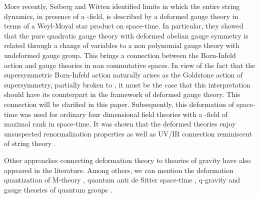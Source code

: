 \documentclass[a4paper,12pt]{article}
\begin{document}
 More recently, Seiberg and Witten \cite{sw}
identified limits in which the entire string dynamics, in
presence of a \coordHE{}-field, is described by a 
 deformed  gauge theory in terms of a Weyl-Moyal star product on
space-time.
In particular, they showed  that the pure quadratic gauge theory with
deformed abelian 
gauge symmetry is related through a change of variables to a non
polynomial gauge theory 
with undeformed gauge group. This brings a connection between the
Born-Infeld action and
gauge theories in non commutative spaces. In view of the fact that the
supersymmetric 
Born-Infeld \cite{cf} action naturally arises as the Goldstone action of
\coordHE{} supersymmetry,
partially broken to \coordHE{} \cite{bg}, it must be the case that this
interpretation should have its 
counterpart in the framework of deformed gauge theory. This connection
will be clarified in this paper. 
 Subsequently,
this  deformation of space-time was used  for  ordinary four dimensional
field theories with a 
\coordHE{}-field of maximal rank in \coordHE{} space-time.
It was shown that the deformed theories enjoy unsuspected renormalization
properties as well
as UV/IR connection reminiscent of string theory \cite{mrs}. 

Other approaches connecting deformation theory to theories of gravity have
also  
appeared in the literature.  Among others, we can mention the deformation quantization
of M-theory
\cite{mn}, quantum anti de Sitter space-time \cite{hs},  q-gravity
\cite{finki} and
gauge theories of quantum groups \cite{c}.
\end{document}

